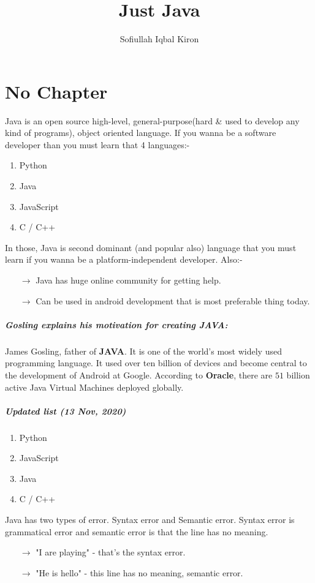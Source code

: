 \documentclass[9 pt]{book}
\title{Just Java}
\author{Sofiullah Iqbal Kiron}
\begin{document}
\maketitle

\chapter{No Chapter}
Java is an open source high-level, general-purpose(hard \& used to develop any kind of programs), object oriented language. If you wanna be a software developer than you must learn that 4 languages:-

\begin{enumerate}
	\item Python
	\item Java
	\item JavaScript
	\item C / C++
\end{enumerate}

In those, Java is second dominant (and popular also) language that you must learn if you wanna be a platform-independent developer. Also:-
\begin{itemize}
	\item[$\rightarrow$] Java has huge online community for getting help.
	\item[$\rightarrow$] Can be used in android development that is most preferable thing today.
\end{itemize}

\paragraph{Gosling explains his motivation for creating \textbf{JAVA}:}
James Gosling, father of \textbf{JAVA}. It is one of the world's most widely used programming language. It used over ten billion of devices and become central to the development of Android at Google. According to \textbf{Oracle}, there are $51$ billion active Java Virtual Machines deployed globally.

\paragraph{Updated list (13 Nov, 2020)}
\begin{enumerate}
	\item Python
	\item JavaScript
	\item Java
	\item C / C++
\end{enumerate}

Java has two types of error. Syntax error and Semantic error. Syntax error is grammatical error and semantic error is that the line has no meaning.
\begin{itemize}
	\item[$\rightarrow$] "I are playing" - that's the syntax error.
	\item[$\rightarrow$] "He is hello" - this line has no meaning, semantic error.
\end{itemize}
\end{document}
